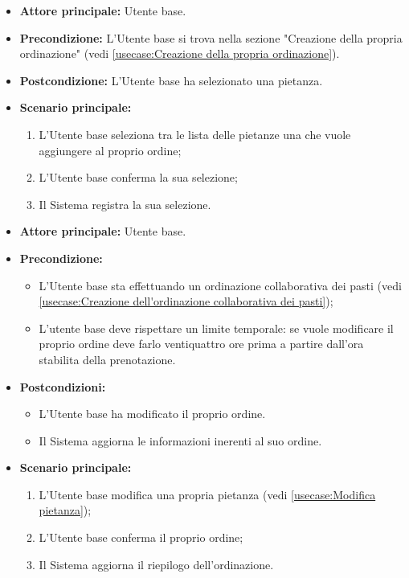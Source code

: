 \label{usecase:Seleziona pietanza}
\begin{itemize}
	\item \textbf{Attore principale:} Utente base.

	\item \textbf{Precondizione:} L'Utente base si trova nella sezione "Creazione della propria ordinazione" (vedi \autoref{usecase:Creazione della propria ordinazione}).

	\item \textbf{Postcondizione:} L'Utente base ha selezionato una pietanza.

	\item \textbf{Scenario principale:}
	      \begin{enumerate}
		      \item L'Utente base seleziona tra le lista delle pietanze una che vuole aggiungere al proprio ordine;
		      \item L'Utente base conferma la sua selezione;
		      \item Il Sistema registra la sua selezione.
	      \end{enumerate}
\end{itemize}

\label{usecase:Modifica della propria ordinazione}
\begin{itemize}
	\item \textbf{Attore principale:} Utente base.

	\item \textbf{Precondizione:}
	      \begin{itemize}
		      \item L'Utente base sta effettuando un ordinazione collaborativa dei pasti (vedi \autoref{usecase:Creazione dell'ordinazione collaborativa dei pasti});
		      \item L'utente base deve rispettare un limite temporale: se vuole modificare il proprio ordine deve farlo ventiquattro ore prima a partire dall'ora stabilita della prenotazione.
	      \end{itemize}

	\item \textbf{Postcondizioni:}
	      \begin{itemize}
		      \item L'Utente base ha modificato il proprio ordine.
		      \item Il Sistema aggiorna le informazioni inerenti al suo ordine.
	      \end{itemize}

	\item \textbf{Scenario principale:}
	      \begin{enumerate}
		      \item L'Utente base modifica una propria pietanza (vedi \autoref{usecase:Modifica pietanza});
		      \item L'Utente base conferma il proprio ordine;
		      \item Il Sistema aggiorna il riepilogo dell'ordinazione.
	      \end{enumerate}
\end{itemize}

